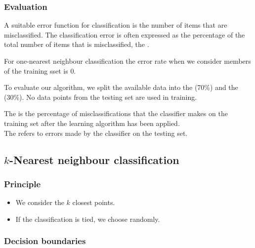 \documentclass{article}
\begin{document}
\subsubsection{Evaluation}

\begin{definition}
	A suitable error function for classification is the number of items
	that are misclassified. The classification error is often expressed 
	as the percentage of the total number of items that is misclassified,
	the .
\end{definition}
\begin{theorem}
	For one-nearest neighbour classification the error rate when we consider
	members of the training sset is $0$.
\end{theorem}
\begin{definition}
	To evaluate our algorithm, we split the available data into the
	 (70\%) and the  (30\%). No data points
	from the testing set are used in training.
\end{definition}
\begin{definition}
	The  is the percentage of misclassifications
	that the classifier makes on the training set after the learning 
	algorithm has been applied.\\
	The  refers to errors made by the classifier
	on the testing set.
\end{definition}


\subsection{$k$-Nearest neighbour classification}


\subsubsection{Principle}

\begin{itemize}
	\item We consider the $k$ closest points.
	\item If the classification is tied, we choose randomly.
\end{itemize}

\subsubsection{Decision boundaries}
\end{document}
